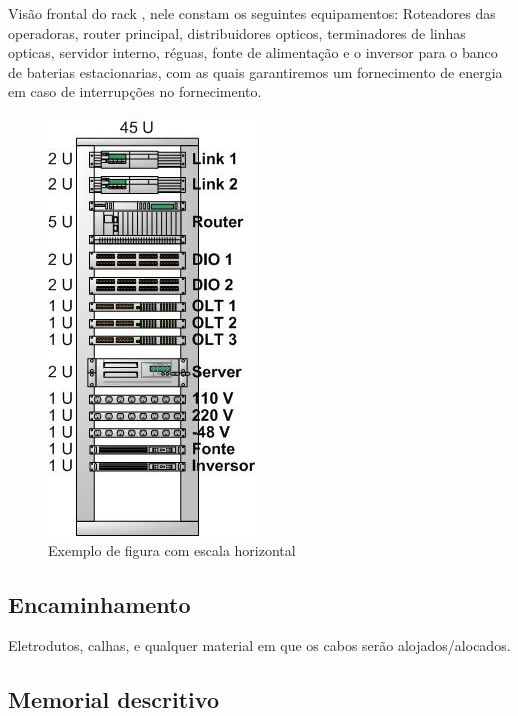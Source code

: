 \documentclass[	DIV=calc,%
							paper=a4,%
							fontsize=12pt,%
							onecolumn]{scrartcl}	 					%
\begin{document}
Visão frontal do rack , nele constam os seguintes equipamentos: Roteadores das operadoras,  router principal, distribuidores opticos, terminadores de linhas opticas, servidor interno, réguas, fonte de alimentação e o inversor para o banco de baterias estacionarias, com as quais garantiremos um fornecimento de energia em caso de interrupções no fornecimento.

\begin{figure}
\centering
\includegraphics[height=\textwidth]{rack}
\caption{Exemplo de figura com escala horizontal}
\label{rack}
\end{figure}




\subsection{Encaminhamento}
Eletrodutos, calhas, e qualquer material em que os cabos serão alojados/alocados.

\subsection{Memorial descritivo}
\end{document}
